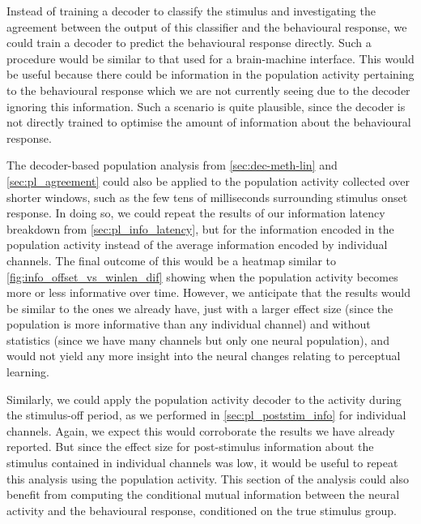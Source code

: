Instead of training a decoder to classify the stimulus and investigating the agreement between the output of this classifier and the behavioural response, we could train a decoder to predict the behavioural response directly.
Such a procedure would be similar to that used for a brain-machine interface.
This would be useful because there could be information in the population activity pertaining to the behavioural response which we are not currently seeing due to the decoder ignoring this information.
Such a scenario is quite plausible, since the decoder is not directly trained to optimise the amount of information about the behavioural response.

The decoder-based population analysis from \autoref{sec:dec-meth-lin} and \autoref{sec:pl_agreement} could also be applied to the population activity collected over shorter windows, such as the few tens of milliseconds surrounding stimulus onset response.
In doing so, we could repeat the results of our information latency breakdown from \autoref{sec:pl_info_latency}, but for the information encoded in the population activity instead of the average information encoded by individual channels.
The final outcome of this would be a heatmap similar to \autoref{fig:info_offset_vs_winlen_dif} showing when the population activity becomes more or less informative over time.
However, we anticipate that the results would be similar to the ones we already have, just with a larger effect size (since the population is more informative than any individual channel) and without statistics (since we have many channels but only one neural population), and would not yield any more insight into the neural changes relating to perceptual learning.

Similarly, we could apply the population activity decoder to the activity during the stimulus-off period, as we performed in \autoref{sec:pl_poststim_info} for individual channels.
Again, we expect this would corroborate the results we have already reported.
But since the effect size for post-stimulus information about the stimulus contained in individual channels was low, it would be useful to repeat this analysis using the population activity.
This section of the analysis could also benefit from computing the conditional mutual information between the neural activity and the behavioural response, conditioned on the true stimulus group.

